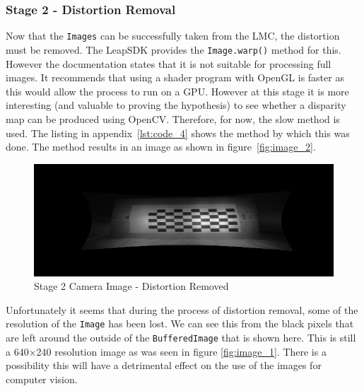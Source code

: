 \documentclass[11pt,oneside]{report}
\newcommand\code[1]{\texttt{#1}}
\begin{document}
		\subsubsection{Stage 2 - Distortion Removal}
		Now that the \code{Images} can be successfully taken from the LMC, the distortion must be removed.
		The LeapSDK provides the \code{Image.warp()} method for this.
		However the documentation states that it is not suitable for processing full images.
		It recommends that using a shader program with OpenGL is faster as this would allow the process to run on a GPU.
		However at this stage it is more interesting (and valuable to proving the hypothesis) to see whether a disparity map can be produced using OpenCV.
		Therefore, for now, the slow method is used.
		The listing in appendix~\ref{lst:code_4} shows the method by which this was done.
		The method results in an image as shown in figure~\ref{fig:image_2}.
		\begin{figure}
			\centering
    				\includegraphics[width=\textwidth]{2}
    				\caption{Stage 2 Camera Image - Distortion Removed \protect {\label{fig:image_2}}}

		\end{figure}	
		Unfortunately it seems that during the process of distortion removal, some of the resolution of the \code{Image} has been lost.
		We can see this from the black pixels that are left around the outside of the \code{BufferedImage} that is shown here.
		This is still a 640$\times$240 resolution image as was seen in figure \ref{fig:image_1}.
		There is a possibility this will have a detrimental effect on the use of the images for computer vision.
		
\end{document}
